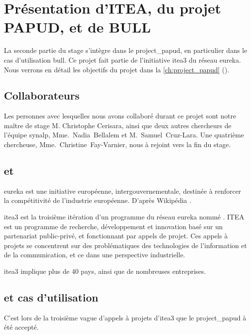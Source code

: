 \chapter{Présentation d'ITEA, du projet PAPUD, et de BULL}
La seconde partie du stage s'intègre dans le \gls{project_papud}, en particulier dans le cas d'utilisation \gls{bull}. Ce projet fait partie de l'initiative \gls{itea3} du réseau \gls{eureka}.
%
Nous verrons en détail les objectifs du projet dans la \autoref{ch:project_papud} ().


\section{Collaborateurs}\label{sec:papud_colabo}
Les personnes avec lesquelles nous avons collaboré durant ce projet sont notre maître de stage M. Christophe Cerisara, ainsi que deux autres chercheurs de l'équipe \gls{synalp}, \mbox{Mme.~Nadia~Bellalem} et \mbox{M.~Samuel~Cruz-Lara}.
Une quatrième chercheuse, \mbox{Mme.~Christine~Fay-Varnier}, nous à rejoint vers la fin du stage.

\section{ et }
\og\gls{eureka} est une initiative européenne, intergouvernementale, destinée à renforcer la compétitivité de l’industrie européenne.\fg{} D'après Wikipédia \autocite{wiki_eureka}.

\gls{itea3} est la troisième itération d'un programme du réseau \gls{eureka} nommé .
ITEA est un programme de recherche, développement et innovation basé sur un partenariat public-privé, et fonctionnant par appels de projet.
Ces appels à projets se concentrent sur des problématiques des technologies de l'information et de la communication, et ce dans une perspective industrielle.

\gls{itea3} implique plus de 40 pays, ainsi que de nombreuses entreprises.

\pagebreak
\section{ et cas d'utilisation }
C'est lors de la troisième vague d'appels à projets d'\gls{itea3} que le  \gls{project_papud} à été accepté.

